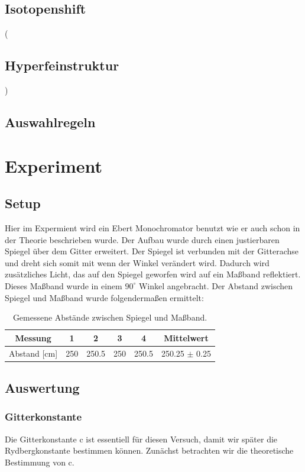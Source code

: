 \documentclass[]{article}
\begin{document}
\subsection{Isotopenshift}



(\subsection{Hyperfeinstruktur})
\subsection{Auswahlregeln} %


\newpage
\section{Experiment}
\subsection{Setup}

Hier im Expermient wird ein Ebert Monochromator benutzt wie er auch schon in der Theorie beschrieben wurde. Der Aufbau wurde durch einen justierbaren Spiegel über dem Gitter erweitert. Der Spiegel ist verbunden mit der Gitterachse und dreht sich somit mit wenn der Winkel verändert wird. Dadurch wird zusätzliches Licht, das auf den Spiegel geworfen wird auf ein Maßband reflektiert. Dieses Maßband wurde in einem $90^\circ$ Winkel angebracht. Der Abstand zwischen Spiegel und Maßband wurde folgendermaßen ermittelt:

\begin{table}[h!]
	\centering
	\begin{tabular}{c|c|c|c|c|c}
		Messung & 1 & 2 & 3 & 4 & Mittelwert \\
		\hline
		Abstand [cm] & 250 & 250.5 & 250 & 250.5 & 250.25 $\pm$ 0.25 \\
	\end{tabular}
	\caption{Gemessene Abstände zwischen Spiegel und Maßband.}
\end{table}



\subsection{Auswertung}
\subsubsection{Gitterkonstante}
Die Gitterkonstante c ist essentiell für diesen Versuch, damit wir später die Rydbergkonstante bestimmen  können. Zunächst betrachten wir die theoretische Bestimmung von c.
\end{document}
